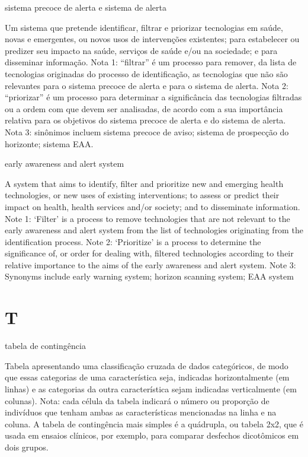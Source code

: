 \documentclass[
  openany]{book}
\begin{document}
sistema precoce de alerta e sistema de alerta

Um sistema que pretende identificar, filtrar e priorizar tecnologias em saúde, novas e emergentes, ou novos usos de intervenções existentes; para estabelecer ou predizer seu impacto na saúde, serviços de saúde e/ou na sociedade; e para disseminar informação. Nota 1: ``filtrar'' é um processo para remover, da lista de tecnologias originadas do processo de identificação, as tecnologias que não são relevantes para o sistema precoce de alerta e para o sistema de alerta. Nota 2: ``priorizar'' é um processo para determinar a significância das tecnologias filtradas ou a ordem com que devem ser analisadas, de acordo com a sua importância relativa para os objetivos do sistema precoce de alerta e do sistema de alerta. Nota 3: sinônimos incluem sistema precoce de aviso; sistema de prospecção do horizonte; sistema EAA.

early awareness and alert system

A system that aims to identify, filter and prioritize new and emerging health technologies, or new uses of existing interventions; to assess or predict their impact on health, health services and/or society; and to disseminate information. Note 1: `Filter' is a process to remove technologies that are not relevant to the early awareness and alert system from the list of technologies originating from the identification process. Note 2: `Prioritize' is a process to determine the significance of, or order for dealing with, filtered technologies according to their relative importance to the aims of the early awareness and alert system. Note 3: Synonyms include early warning system; horizon scanning system; EAA system

\hypertarget{t}{%
\chapter*{T}\label{t}}

tabela de contingência

Tabela apresentando uma classificação cruzada de dados categóricos, de modo que essas categorias de uma característica seja, indicadas horizontalmente (em linhas) e as categorias da outra característica sejam indicadas verticalmente (em colunas). Nota: cada célula da tabela indicará o número ou proporção de indivíduos que tenham ambas as características mencionadas na linha e na coluna. A tabela de contingência mais simples é a quádrupla, ou tabela 2x2, que é usada em ensaios clínicos, por exemplo, para comparar desfechos dicotômicos em dois grupos.
\end{document}

